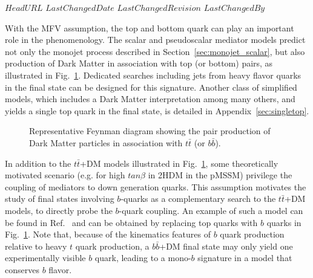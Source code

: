 \svnidlong
{$HeadURL$}
{$LastChangedDate$}
{$LastChangedRevision$}
{$LastChangedBy$}

With the MFV assumption, the top and bottom
quark can play an important  role in the phenomenology.
The scalar and pseudoscalar mediator models predict not only
the monojet process described in Section~\ref{sec:monojet_scalar}, but also production of Dark Matter
in association with top (or bottom) pairs, as illustrated in Fig.~\ref{fig:TTbarPhi}. 
Dedicated searches including jets from heavy flavor quarks in the final state
can be designed for this signature. Another class of simplified models,  
which includes a Dark Matter interpretation among many others, and yields a single
top quark in the final state, is detailed in Appendix~\ref{sec:singletop}. 

\begin{figure}[h!]
\centering
  \textwidth
  \begin{feynmandiagram}[modelTTbarMET]
  \end{feynmandiagram}
\caption{Representative Feynman
diagram showing the pair production of Dark Matter particles in
association with $t\bar t$ (or $b\bar b$).}
\label{fig:TTbarPhi}
\end{figure}


In addition to the $t\bar t$+DM models illustrated in Fig.~\ref{fig:TTbarPhi}, 
some theoretically motivated scenario (e.g. for high $tan\beta$ in 2HDM in the pMSSM) 
privilege the coupling of \spinzero mediators to down generation quarks.
This assumption motivates the study of final states involving $b$-quarks 
as a complementary search to the $t\bar
t$+DM models, to directly probe the $b$-quark coupling. 
An example of such a model can be found in Ref.~\cite{Buckley:2014fba}
and can be obtained by replacing top quarks with $b$ quarks in Fig.~\ref{fig:TTbarPhi}.
Note that, because of the kinematics features of $b$ quark production relative
to heavy $t$ quark production, a $b\bar b$+DM final state may only yield one
experimentally visible $b$ quark, leading to a mono-$b$ signature in a model that conserves $b$ flavor.

